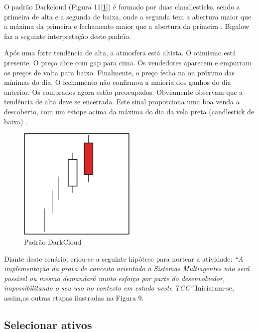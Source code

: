 O padrão Darkcloud (Figura 11[\ref{f11}]) é formado por duas clandlesticks, sendo a primeira de alta e a segunda de baixa, onde a segunda tem a abertura maior que a máxima da primeira e fechamento maior que a abertura da primeira \cite[p.61]{matsura2006}. Bigalow faz a seguinte interpretação deste padrão.

\begin{citacao}
Após uma forte tendência de alta, a atmosfera está altista. O otimismo está presente. O preço abre com gap para cima. Os vendedores aparecem e empurram os preços de volta para baixo. Finalmente, o preço fecha na ou próximo das mínimas do dia. O fechamento não confirmou a maioria dos ganhos do dia anterior. Os comprados agora estão preocupados. Obviamente observam que a tendência de alta deve se encerrada. Este sinal proporciona uma boa venda a descoberto, com um estope acima da máxima do dia da vela preta (candlestick de baixa) . \newline \cite[p.47]{bigalow2010}

\end{citacao}
\begin{figure}[h]
\centering
\label{f11}
\includegraphics[width=0.5\textwidth]{figuras/f11}
\caption{Padrão DarkCloud}

\end{figure}

Diante deste cenário, criou-se a seguinte hipótese para nortear a atividade: \textit{“A implementação da prova de conceito orientada a Sistemas Multiagentes não será possível ou mesmo demandará muito esforço por parte do desenvolvedor, impossibilitando o seu uso no contexto em estudo neste TCC”}.Iniciaram-se, assim,as outras etapas ilustradas na Figura 9.

\subsection{Selecionar ativos}

